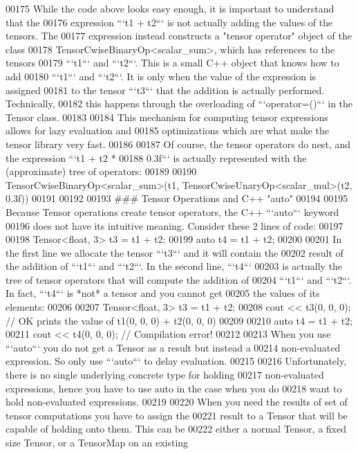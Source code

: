 \begin{DoxyCode}
00175 While the code above looks easy enough, it is important to understand that the
00176 expression ```t1 + t2``` is not actually adding the values of the tensors.  The
00177 expression instead constructs a "tensor operator" object of the class
00178 TensorCwiseBinaryOp<scalar\_sum>, which has references to the tensors
00179 ```t1``` and ```t2```.  This is a small C++ object that knows how to add
00180 ```t1``` and ```t2```.  It is only when the value of the expression is assigned
00181 to the tensor ```t3``` that the addition is actually performed.  Technically,
00182 this happens through the overloading of ```operator=()``` in the Tensor class.
00183 
00184 This mechanism for computing tensor expressions allows for lazy evaluation and
00185 optimizations which are what make the tensor library very fast.
00186 
00187 Of course, the tensor operators do nest, and the expression ```t1 + t2 *
00188 0.3f``` is actually represented with the (approximate) tree of operators:
00189 
00190     TensorCwiseBinaryOp<scalar\_sum>(t1, TensorCwiseUnaryOp<scalar\_mul>(t2, 0.3f))
00191 
00192 
00193 ### Tensor Operations and C++ "auto"
00194 
00195 Because Tensor operations create tensor operators, the C++ ```auto``` keyword
00196 does not have its intuitive meaning.  Consider these 2 lines of code:
00197 
00198     Tensor<float, 3> t3 = t1 + t2;
00199     auto t4 = t1 + t2;
00200 
00201 In the first line we allocate the tensor ```t3``` and it will contain the
00202 result of the addition of ```t1``` and ```t2```.  In the second line, ```t4```
00203 is actually the tree of tensor operators that will compute the addition of
00204 ```t1``` and ```t2```.  In fact, ```t4``` is *not* a tensor and you cannot get
00205 the values of its elements:
00206 
00207     Tensor<float, 3> t3 = t1 + t2;
00208     cout << t3(0, 0, 0);  // OK prints the value of t1(0, 0, 0) + t2(0, 0, 0)
00209 
00210     auto t4 = t1 + t2;
00211     cout << t4(0, 0, 0);  // Compilation error!
00212 
00213 When you use ```auto``` you do not get a Tensor as a result but instead a
00214 non-evaluated expression.  So only use ```auto``` to delay evaluation.
00215 
00216 Unfortunately, there is no single underlying concrete type for holding
00217 non-evaluated expressions, hence you have to use auto in the case when you do
00218 want to hold non-evaluated expressions.
00219 
00220 When you need the results of set of tensor computations you have to assign the
00221 result to a Tensor that will be capable of holding onto them.  This can be
00222 either a normal Tensor, a fixed size Tensor, or a TensorMap on an existing

\end{DoxyCode}
